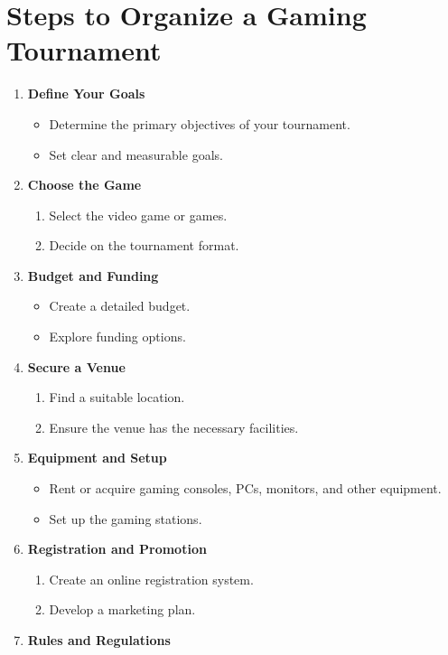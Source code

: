 \documentclass[11pt,a4paper]{article}
\begin{document}
	\section{Steps to Organize a Gaming Tournament}
	\begin{multicols}{2}
	\begin{enumerate}
		\item \textbf{Define Your Goals}
		\begin{itemize}
			\item Determine the primary objectives of your tournament.
			\item Set clear and measurable goals.
		\end{itemize}
		\item \textbf{Choose the Game}
		\begin{enumerate}
			\item Select the video game or games.
			\item Decide on the tournament format.
		\end{enumerate}
		\item \textbf{Budget and Funding}
		\begin{itemize}
			\item Create a detailed budget.
			\item Explore funding options.
		\end{itemize}
		\item \textbf{Secure a Venue}
		\begin{enumerate}
			\item Find a suitable location.
			\item Ensure the venue has the necessary facilities.
		\end{enumerate}
		\item \textbf{Equipment and Setup}
		\begin{itemize}
			\item Rent or acquire gaming consoles, PCs, monitors, and other equipment.
			\item Set up the gaming stations.
		\end{itemize}
		\item \textbf{Registration and Promotion}
		\begin{enumerate}
			\item Create an online registration system.
			\item Develop a marketing plan.
		\end{enumerate}
		\item \textbf{Rules and Regulations}
		\begin{itemize}

\end{itemize}
\end{enumerate}
\end{multicols}
\end{document}
